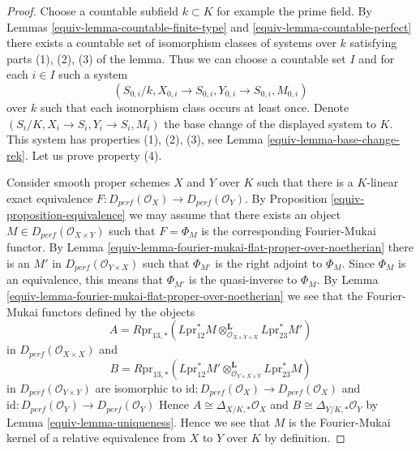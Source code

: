 \begin{proof}

Choose a countable subfield $k \subset K$ for example the prime field.
By Lemmas \ref{equiv-lemma-countable-finite-type} and \ref{equiv-lemma-countable-perfect}
there exists a countable set of isomorphism classes of systems
over $k$ satisfying parts (1), (2), (3) of the lemma.
Thus we can choose a countable set
$I$ and for each $i \in I$ such a system
$$
(S_{0, i}/k, X_{0, i} \to S_{0, i}, Y_{0, i} \to S_{0, i}, M_{0, i})
$$
over $k$ such that each isomorphism class occurs at least once.
Denote $(S_i/K, X_i \to S_i, Y_i \to S_i, M_i)$ the base change
of the displayed system to $K$. This system has properties (1), (2), (3),
see Lemma \ref{equiv-lemma-base-change-rek}. Let us prove property (4).

\medskip\noindent
Consider smooth proper schemes $X$ and $Y$ over $K$
such that there is a $K$-linear exact equivalence
$F : D_{perf}(\mathcal{O}_X) \to D_{perf}(\mathcal{O}_Y)$.
By Proposition \ref{equiv-proposition-equivalence}
we may assume that there exists an object
$M \in D_{perf}(\mathcal{O}_{X \times Y})$
such that $F = \Phi_M$ is the corresponding Fourier-Mukai functor.
By Lemma \ref{equiv-lemma-fourier-mukai-flat-proper-over-noetherian}
there is an $M'$ in $D_{perf}(\mathcal{O}_{Y \times X})$
such that $\Phi_{M'}$ is the right adjoint to $\Phi_M$.
Since $\Phi_M$ is an equivalence, this means that
$\Phi_{M'}$ is the quasi-inverse to $\Phi_M$.
By Lemma \ref{equiv-lemma-fourier-mukai-flat-proper-over-noetherian}
we see that the Fourier-Mukai functors defined by the objects
$$
A = R\text{pr}_{13, *}(
L\text{pr}_{12}^*M
\otimes_{\mathcal{O}_{X \times Y \times X}}^\mathbf{L}
L\text{pr}_{23}^*M')
$$
in $D_{perf}(\mathcal{O}_{X \times X})$ and
$$
B = R\text{pr}_{13, *}(
L\text{pr}_{12}^*M'
\otimes_{\mathcal{O}_{Y \times X \times Y}}^\mathbf{L}
L\text{pr}_{23}^*M)
$$
in $D_{perf}(\mathcal{O}_{Y \times Y})$
are isomorphic to
$\text{id} : D_{perf}(\mathcal{O}_X) \to D_{perf}(\mathcal{O}_X)$
and
$\text{id} : D_{perf}(\mathcal{O}_Y) \to D_{perf}(\mathcal{O}_Y)$
Hence
$A \cong \Delta_{X/K, *}\mathcal{O}_X$ and
$B \cong \Delta_{Y/K, *}\mathcal{O}_Y$
by Lemma \ref{equiv-lemma-uniqueness}. Hence we see that $M$ is the
Fourier-Mukai kernel of a relative equivalence from $X$ to $Y$
over $K$ by definition.


\end{proof}
